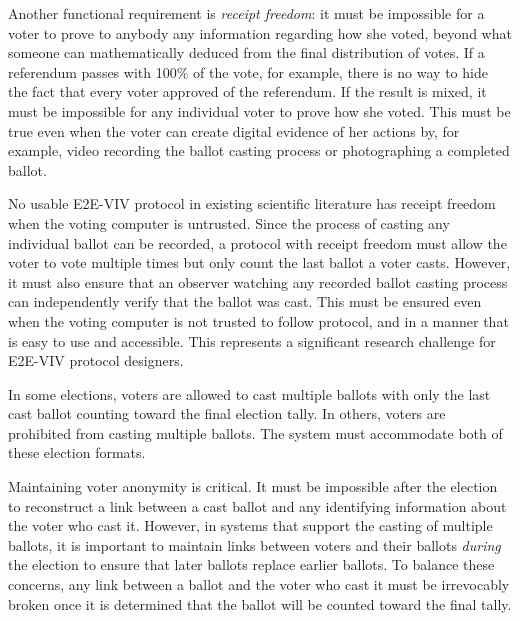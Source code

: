 Another functional requirement is \emph{receipt freedom}: it must be
impossible for a voter to prove to anybody any information regarding
how she voted, beyond what someone can mathematically deduced from the
final distribution of votes. If a referendum passes with 100\% of the
vote, for example, there is no way to hide the fact that every voter
approved of the referendum. If the result is mixed, it must be
impossible for any individual voter to prove how she voted.  This must
be true even when the voter can create digital evidence of her actions
by, for example, video recording the ballot casting process or
photographing a completed ballot. 

No usable E2E-VIV protocol in existing scientific literature has
receipt freedom when the voting computer is untrusted. Since the
process of casting any individual ballot can be recorded, a protocol
with receipt freedom must allow the voter to vote multiple times but
only count the last ballot a voter casts. However, it must also ensure
that an observer watching any recorded ballot casting process can
independently verify that the ballot was cast. This must be ensured
even when the voting computer is not trusted to follow protocol, and
in a manner that is easy to use and accessible. This represents a
significant research challenge for E2E-VIV protocol designers.

In some elections, voters are allowed to cast multiple ballots with
only the last cast ballot counting toward the final election tally. In
others, voters are prohibited from casting multiple ballots. The
system must accommodate both of these election formats.

Maintaining voter anonymity is critical. It must be impossible after
the election to reconstruct a link between a cast ballot and any
identifying information about the voter who cast it. However, in
systems that support the casting of multiple ballots, it is important
to maintain links between voters and their ballots \emph{during} the
election to ensure that later ballots replace earlier ballots. To
balance these concerns, any link between a ballot and the voter who
cast it must be irrevocably broken once it is determined that the
ballot will be counted toward the final tally.

%

